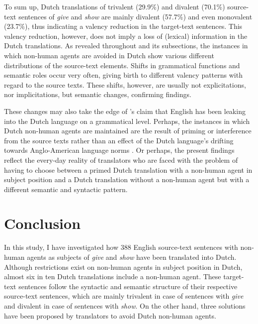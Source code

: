 \documentclass[output=paper]{LSP/langsci}
\begin{document}
To sum up, Dutch translations of trivalent (29.9\%) and divalent (70.1\%) source-text sentences of \textit{give} and \textit{show} are mainly divalent (57.7\%) and even monovalent (23.7\%), thus indicating a valency reduction in the target-text sentences. This valency reduction, however, does not imply a loss of (lexical) information in the Dutch translations. As revealed throughout  and its subsections, the instances in which non-human agents are avoided in Dutch show various different distributions of the source-text elements. Shifts in grammatical functions and semantic roles occur very often, giving birth to different valency patterns with regard to the source texts. These shifts, however, are usually not explicitations, nor implicitations, but semantic changes, confirming \citep{Vandepitte2007} findings.

These changes may also take the edge of \citeauthor{Delsoir2011}'s \citeyear{Delsoir2011} claim that English has been leaking into the Dutch language on a grammatical level. Perhaps, the instances in which Dutch non-human agents are maintained are the result of priming \citep[e.g.][]{Vandepitte2011,Delsoir2011} or interference from the source texts rather than an effect of the Dutch language’s drifting towards Anglo-American language norms \citep[ e.g.][]{House2008}. Or perhaps, the present findings reflect the every-day reality of translators who are faced with the problem of having to choose between a primed Dutch translation with a non-human agent in subject position and a Dutch translation without a non-human agent but with a different semantic and syntactic pattern. 

\section{Conclusion}

In this study, I have investigated how 388 English source-text sentences with non-human agents as subjects of \textit{give} and \textit{show} have been translated into Dutch. Although restrictions exist on non-human agents in subject position in Dutch, almost six in ten Dutch translations include a non-human agent. These target-text sentences follow the syntactic and semantic structure of their respective source-text sentences, which are mainly trivalent in case of sentences with \textit{give} and divalent in case of sentences with \textit{show}. On the other hand, three solutions have been proposed by translators to avoid Dutch non-human agents.
\end{document}
